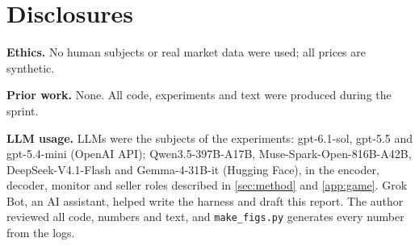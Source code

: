 \documentclass[11pt,letterpaper]{article}
\newcommand{\lead}[1]{\par\addvspace{4pt}\noindent\textbf{#1}}
\begin{document}
\section{Disclosures}
\label{app:ethics}
\lead{Ethics.} No human subjects or real market data were used; all prices are synthetic.

\lead{Prior work.} None. All code, experiments and text were produced during the sprint.

\lead{LLM usage.} LLMs were the subjects of the experiments: gpt-6.1-sol, gpt-5.5 and gpt-5.4-mini (OpenAI API); Qwen3.5-397B-A17B, Muse-Spark-Open-816B-A42B, DeepSeek-V4.1-Flash and Gemma-4-31B-it (Hugging Face), in the encoder, decoder, monitor and seller roles described in \cref{sec:method} and \cref{app:game}. Grok Bot, an AI assistant, helped write the harness and draft this report. The author reviewed all code, numbers and text, and \texttt{make\_figs.py} generates every number from the logs.
\end{document}
